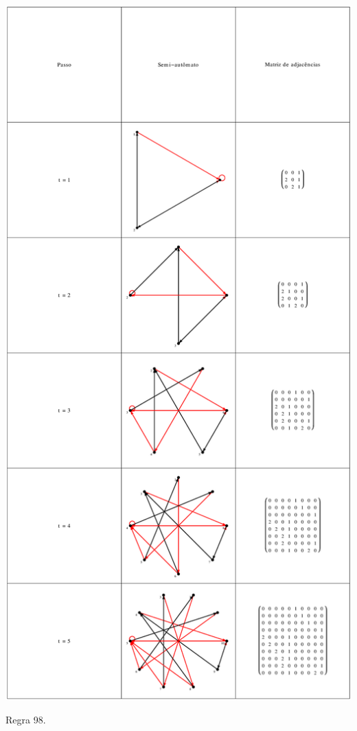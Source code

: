 \documentclass[12pt,a4paper]{article}
\begin{document}
\begin{table}[H]
\begin{center}
\includegraphics[scale=0.32]{img/mat/matr98.eps}
\caption{Regra 98.}
\label{tab:mr98}
\end{center}
\end{table}
\end{document}

